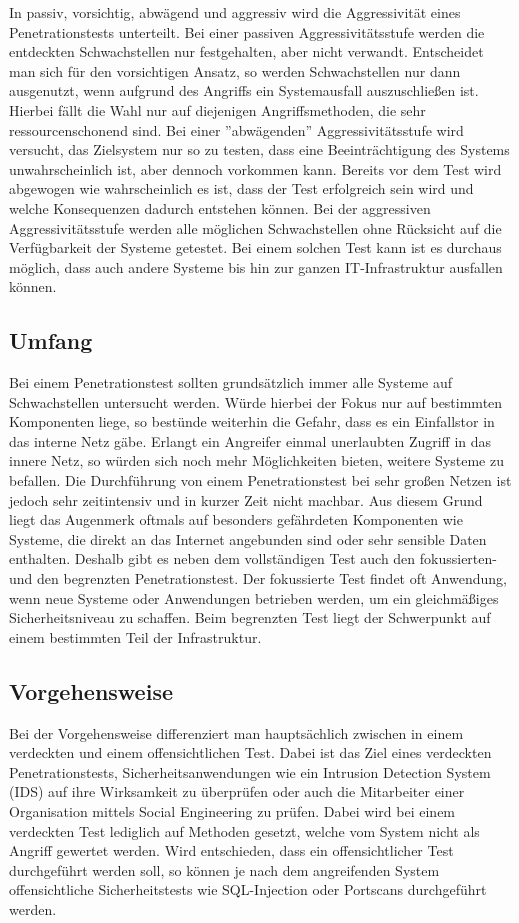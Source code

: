 In passiv, vorsichtig, abwägend und aggressiv wird die Aggressivität eines Penetrationstests unterteilt. Bei einer passiven Aggressivitätsstufe werden die entdeckten Schwachstellen nur festgehalten, aber nicht verwandt. Entscheidet man sich für den vorsichtigen Ansatz, so werden Schwachstellen nur dann ausgenutzt, wenn aufgrund des Angriffs ein Systemausfall auszuschließen ist. Hierbei fällt die Wahl nur auf diejenigen Angriffsmethoden, die sehr ressourcenschonend sind. Bei einer ”abwägenden” Aggressivitätsstufe wird versucht, das Zielsystem nur so zu testen, dass eine Beeinträchtigung des Systems unwahrscheinlich ist, aber dennoch vorkommen kann. Bereits vor dem Test wird abgewogen wie wahrscheinlich es ist, dass der Test erfolgreich sein wird und welche Konsequenzen dadurch entstehen können. Bei der aggressiven Aggressivitätsstufe werden alle möglichen Schwachstellen ohne Rücksicht auf die Verfügbarkeit der Systeme getestet. Bei einem solchen Test kann ist es durchaus möglich, dass auch andere Systeme bis hin zur ganzen IT-Infrastruktur ausfallen können.

\subsection{Umfang}

Bei einem Penetrationstest sollten grundsätzlich immer alle Systeme auf Schwachstellen untersucht werden. Würde hierbei der Fokus nur auf bestimmten Komponenten liege, so bestünde weiterhin die Gefahr, dass es ein Einfallstor in das interne Netz gäbe. Erlangt ein Angreifer einmal unerlaubten Zugriff in das innere Netz, so würden sich noch mehr Möglichkeiten bieten, weitere Systeme zu befallen. Die Durchführung von einem Penetrationstest bei sehr großen Netzen ist jedoch sehr zeitintensiv und in kurzer Zeit nicht machbar. Aus diesem Grund liegt das Augenmerk oftmals auf besonders gefährdeten Komponenten wie Systeme, die direkt an das Internet angebunden sind oder sehr sensible Daten enthalten. Deshalb gibt es neben dem vollständigen Test auch den fokussierten- und den begrenzten Penetrationstest. Der fokussierte Test findet oft Anwendung, wenn
neue Systeme oder Anwendungen betrieben werden, um ein gleichmäßiges Sicherheitsniveau zu schaffen. Beim begrenzten Test liegt der Schwerpunkt auf einem bestimmten Teil der Infrastruktur.

\subsection{Vorgehensweise}
Bei der Vorgehensweise differenziert man hauptsächlich zwischen in einem verdeckten und einem offensichtlichen Test. Dabei ist das Ziel eines verdeckten Penetrationstests, Sicherheitsanwendungen wie ein Intrusion Detection System (IDS) auf ihre Wirksamkeit zu überprüfen oder auch die Mitarbeiter einer Organisation mittels Social Engineering zu prüfen. Dabei wird bei einem verdeckten Test lediglich auf Methoden gesetzt, welche vom System nicht als Angriff gewertet werden. Wird entschieden, dass ein offensichtlicher Test durchgeführt werden soll, so können je nach dem angreifenden System offensichtliche Sicherheitstests wie SQL-Injection oder Portscans durchgeführt werden.


